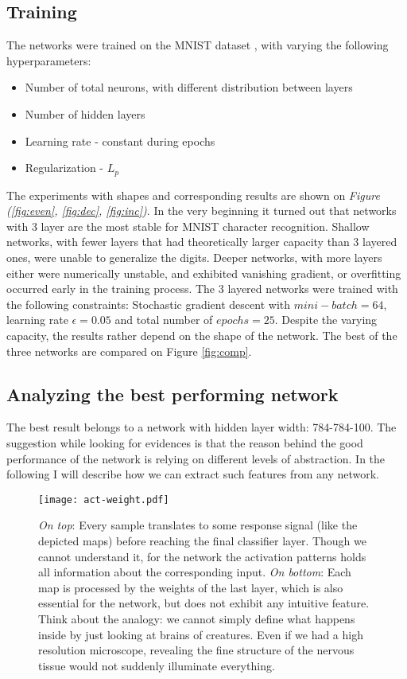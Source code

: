 \subsection{Training}
\label{train}
The networks were trained on the MNIST dataset \cite{mnist}, with varying the following hyperparameters:
\begin{itemize}
    \item Number of total neurons, with different distribution between layers
    \item Number of hidden layers
    \item Learning rate - constant during epochs
    \item Regularization - $L_p$
\end{itemize}

The experiments with shapes and corresponding results are shown on \emph{Figure (\ref{fig:even}, \ref{fig:dec}, \ref{fig:inc})}.
In the very beginning it turned out that networks with 3 layer are the most stable for MNIST character recognition. 
Shallow networks, with fewer layers that had theoretically larger capacity than 3 layered ones, were unable to generalize the digits.
Deeper networks, with more layers either were numerically unstable, and exhibited vanishing gradient, or overfitting occurred early in the training process.
The 3 layered networks were trained with the following constraints: Stochastic gradient descent with $mini-batch=64$, learning rate $\epsilon = 0.05$ and total number of $epochs=25$.
Despite the varying capacity, the results rather depend on the shape of the network. The best of the three networks are compared on Figure \ref{fig:comp}.


\subsection{Analyzing the best performing network}
The best result belongs to a network with hidden layer width: 784-784-100. 
The suggestion while looking for evidences is that the reason behind the good performance of the network is relying on different levels of abstraction.
In the following I will describe how we can extract such features from any network.


\begin{figure}
    \centering
    \texttt{[image: act-weight.pdf]}
    \caption{\emph{On top}: Every sample translates to some response signal (like the depicted maps) before reaching the final classifier layer. 
    Though we cannot understand it, for the network the activation patterns holds all information about the corresponding input.
    \emph{On bottom}: Each map is processed by the weights of the last layer, which is also essential for the network, but does not exhibit any intuitive feature.
    Think about the analogy: we cannot simply define what happens inside by just looking at brains of creatures. 
    Even if we had a high resolution microscope, revealing the fine structure of the nervous tissue would not suddenly illuminate everything.
    }
    \label{fig:act-weight}
\end{figure}



